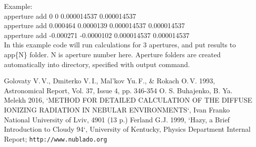 \documentclass[a4paper]{article}
\begin{document}
Example:\\
apperture add 0 0 0.000014537 0.000014537\\
apperture add 0.000464 0.0000139 0.000014537 0.000014537\\
apperture add -0.000271 -0.0000102 0.000014537 0.000014537\\
In this example code will run calculations for 3 apertures, and put results to 
app\{N\} folder. N is aperture number here. Aperture folders are created automatically
into directory, specified with output command.



\begin{thebibliography}{3}
{\small
{} Golovaty V.\,V., Dmiterko V.\,I., Mal'kov Yu.\,F., \& Rokach O.\,V. 1993, Astronomical Report, Vol. 37, Issue 4, pp. 346-354
 O. S. Buhajenko, B. Ya. Melekh 2016, `METHOD FOR DETAILED CALCULATION OF THE DIFFUSE IONIZING RADIATION IN NEBULAR ENVIRONMENTS`, Ivan Franko National University of Lviv, 4901 (13 p.) 
 Ferland G.J. 1999, `Hazy, a Brief Introduction to Cloudy 94`, University of Kentucky, Physics Department Internal Report; \texttt{http://www.nublado.org}
}
\end{thebibliography}
\end{document}
